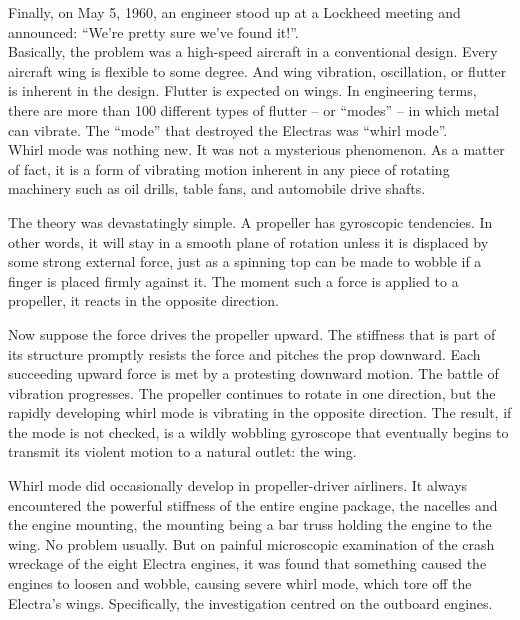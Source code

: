  Finally, on May 5, 1960, an engineer stood up at a Lockheed meeting and announced: ``We're pretty sure we've found it!''.  \\

Basically, the problem was a high-speed aircraft in a conventional design. 
Every aircraft wing is flexible to some degree. And wing vibration, oscillation, or flutter is inherent in the design. Flutter is expected on wings. In engineering terms, there are more than 100 different types of flutter -- or ``modes'' -- in which metal can vibrate. The ``mode'' that destroyed the Electras was ``whirl mode''. \\

Whirl mode was nothing new. It was not a mysterious phenomenon. As a matter of fact, it is a form of vibrating motion inherent in any piece of rotating machinery such as oil drills, table fans, and automobile drive shafts.

The theory was devastatingly simple. A propeller has gyroscopic tendencies. In other words, it will stay in a smooth plane of rotation unless it is displaced by some strong external force, just as a spinning top can be made to wobble if a finger is placed firmly against it. The moment such a force is applied to a propeller, it reacts in the opposite direction.

\begin{emphbox}[]
Now suppose the force drives the propeller upward. The stiffness that is part of its structure promptly resists the force and pitches the prop downward. Each succeeding upward force is met by a protesting downward motion. The battle of vibration progresses. The propeller continues to rotate in one direction, but the rapidly developing whirl mode is vibrating in the opposite direction. The result, if the mode is not checked, is a wildly wobbling gyroscope that eventually begins to transmit its violent motion to a natural outlet: the wing.
\end{emphbox}

Whirl mode did occasionally develop in propeller-driver airliners. It always encountered the powerful stiffness of the entire engine package, the nacelles and the engine mounting, the mounting being a bar truss holding the engine to the wing. No problem usually. But on painful microscopic examination of the crash wreckage of the eight Electra engines, it was found that something caused the engines to loosen and wobble, causing severe whirl mode, which tore off the Electra's wings. Specifically, the investigation centred on the outboard engines.

